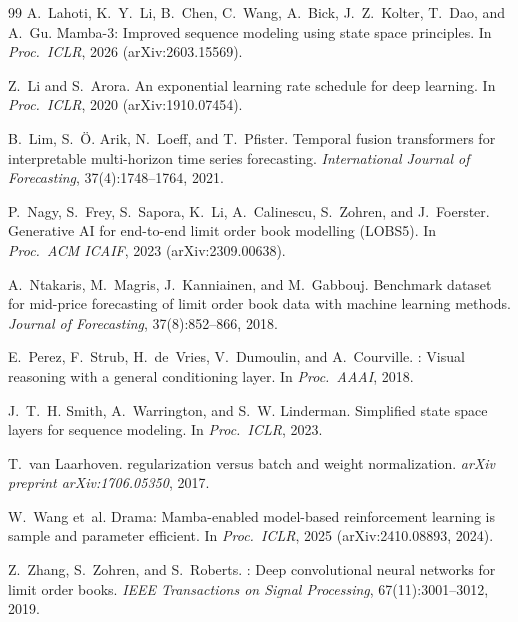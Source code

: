 \documentclass{article}
\begin{document}
\begin{thebibliography}{99}
A.~Lahoti, K.~Y.~Li, B.~Chen, C.~Wang, A.~Bick, J.~Z.~Kolter, T.~Dao, and A.~Gu.
\newblock Mamba-3: Improved sequence modeling using state space principles.
\newblock In \emph{Proc.\ ICLR}, 2026 (arXiv:2603.15569).

Z.~Li and S.~Arora.
\newblock An exponential learning rate schedule for deep learning.
\newblock In \emph{Proc.\ ICLR}, 2020 (arXiv:1910.07454).

B.~Lim, S.~\"O. Arik, N.~Loeff, and T.~Pfister.
\newblock Temporal fusion transformers for interpretable multi-horizon time series forecasting.
\newblock \emph{International Journal of Forecasting}, 37(4):1748--1764, 2021.

P.~Nagy, S.~Frey, S.~Sapora, K.~Li, A.~Calinescu, S.~Zohren, and J.~Foerster.
\newblock Generative {AI} for end-to-end limit order book modelling ({LOBS5}).
\newblock In \emph{Proc.\ ACM ICAIF}, 2023 (arXiv:2309.00638).

A.~Ntakaris, M.~Magris, J.~Kanniainen, and M.~Gabbouj.
\newblock Benchmark dataset for mid-price forecasting of limit order book data with machine learning methods.
\newblock \emph{Journal of Forecasting}, 37(8):852--866, 2018.

E.~Perez, F.~Strub, H.~de~Vries, V.~Dumoulin, and A.~Courville.
: Visual reasoning with a general conditioning layer.
\newblock In \emph{Proc.\ AAAI}, 2018.

J.~T.~H. Smith, A.~Warrington, and S.~W. Linderman.
\newblock Simplified state space layers for sequence modeling.
\newblock In \emph{Proc.\ ICLR}, 2023.

T.~van Laarhoven.
 regularization versus batch and weight normalization.
\newblock \emph{arXiv preprint arXiv:1706.05350}, 2017.

W.~Wang et~al.
\newblock Drama: Mamba-enabled model-based reinforcement learning is sample and parameter efficient.
\newblock In \emph{Proc.\ ICLR}, 2025 (arXiv:2410.08893, 2024).

Z.~Zhang, S.~Zohren, and S.~Roberts.
: Deep convolutional neural networks for limit order books.
\newblock \emph{IEEE Transactions on Signal Processing}, 67(11):3001--3012, 2019.

\end{thebibliography}
\end{document}
